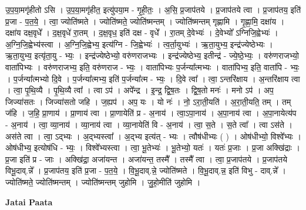 \documentclass[17pt]{extarticle}
\begin{document}
उ॒प॒या॒मगृ॑हीतो ऽसि । उ॒प॒या॒मगृ॑हीत॒ इत्यु॑पया॒म - गृ॒ही॒तः॒ । अ॒सि॒ प्र॒जाप॑तये । प्र॒जाप॑तये त्वा । प्र॒जाप॑तय॒ इति॑ प्र॒जा - प॒त॒ये॒ । त्वा॒ ज्योति॑ष्मते । ज्योति॑ष्मते॒ ज्योति॑ष्मन्तम् । ज्योति॑ष्मन्तम् गृह्णामि । गृ॒ह्णा॒मि॒ दक्षा॑य । दक्षा॑य दक्ष॒वृधे᳚ । द॒क्ष॒वृधे॑ रा॒तम् । द॒क्ष॒वृध॒ इति॑ दक्ष - वृधे᳚ । रा॒तम् दे॒वेभ्यः॑ । दे॒वेभ्यो᳚ ऽग्निजि॒ह्वेभ्यः॑ । अ॒ग्नि॒जि॒ह्वेभ्य॑स्त्वा । अ॒ग्नि॒जि॒ह्वेभ्य॒ इत्य॑ग्नि - जि॒ह्वेभ्यः॑ । त्व॒र्ता॒युभ्यः॑ । ऋ॒ता॒युभ्य॒ इन्द्र॑ज्येष्ठेभ्यः । ऋ॒ता॒युभ्य॒ इत्यृ॑ता॒यु - भ्यः॒ । इन्द्र॑ज्येष्ठेभ्यो॒ वरु॑णराजभ्यः । इन्द्र॑ज्येष्ठेभ्य॒ इतीन्द्र॑ - ज्ये॒ष्ठे॒भ्यः॒ । वरु॑णराजभ्यो॒ वाता॑पिभ्यः । वरु॑णराजभ्य॒ इति॒ वरु॑णराज - भ्यः॒ । वाता॑पिभ्यः प॒र्जन्या᳚त्मभ्यः । वाता॑पिभ्य॒ इति॒ वाता॑पि - भ्यः॒ । प॒र्जन्या᳚त्मभ्यो दि॒वे । प॒र्जन्या᳚त्मभ्य॒ इति॑ प॒र्जन्या᳚त्म - भ्यः॒ । दि॒वे त्वा᳚ । त्वा॒ ऽन्तरि॑क्षाय । अ॒न्तरि॑क्षाय त्वा । त्वा॒ पृ॒थि॒व्यै । पृ॒थि॒व्यै त्वा᳚ । त्वा ऽप॑ । अपे᳚न्द्र । इ॒न्द्र॒ द्वि॒ष॒तः । द्वि॒ष॒तो मनः॑ । मनो ऽप॑ । अप॒ जिज्या॑सतः । जिज्या॑सतो जहि । ज॒ह्यप॑ । अप॒ यः । यो नः॑ । नो॒ ऽरा॒ती॒यति॑ । अ॒रा॒ती॒यति॒ तम् । तम् ज॑हि । ज॒हि॒ प्रा॒णाय॑ । प्रा॒णाय॑ त्वा । प्रा॒णायेति॑ प्र - अ॒नाय॑ । त्वा॒ऽपा॒नाय॑ । अ॒पा॒नाय॑ त्वा । अ॒पा॒नायेत्य॑प - अ॒नाय॑ । त्वा॒ व्या॒नाय॑ । व्या॒नाय॑ त्वा । व्या॒नायेति॑ वि - अ॒नाय॑ । त्वा॒ स॒ते । स॒ते त्वा᳚ । त्वा ऽस॑ते । अस॑ते त्वा । त्वा॒ ऽद्भ्यः । अ॒द्भ्यस्त्वा᳚ । अ॒द्भ्य इत्य॑त् - भ्यः । त्वौष॑धीभ्यः ( ) । ओष॑धीभ्यो॒ विश्वे᳚भ्यः । ओष॑धीभ्य॒ इत्योष॑धि - भ्यः॒ । विश्वे᳚भ्यस्त्वा । त्वा॒ भू॒तेभ्यः॑ । भू॒तेभ्यो॒ यतः॑ । यतः॑ प्र॒जाः । प्र॒जा अक्खि॑द्राः । प्र॒जा इति॑ प्र - जाः । अक्खि॑द्रा॒ अजा॑यन्त । अजा॑यन्त॒ तस्मै᳚ । तस्मै᳚ त्वा । त्वा॒ प्र॒जाप॑तये । प्र॒जाप॑तये विभू॒दाव्.न्ने᳚ । प्र॒जाप॑तय॒ इति॑ प्र॒जा - प॒त॒ये॒ । वि॒भू॒दाव्.न्ने॒ ज्योति॑ष्मते । वि॒भू॒दाव्.न्न॒ इति॑ विभु - दाव्.न्ने᳚ । ज्योति॑ष्मते॒ ज्योति॑ष्मन्तम् । ज्योति॑ष्मन्तम् जुहोमि । जु॒हो॒मीति॑ जुहोमि । \newline

\textbf{Jatai Paata} \newline
\end{document}
